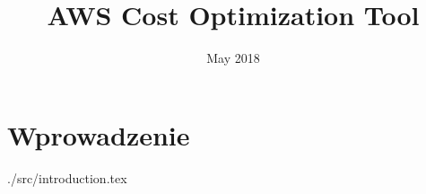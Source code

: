\documentclass[licencjacka,en]{thesisclass}
\title{AWS Cost Optimization Tool}
\date{May 2018}
\begin{document}
\maketitle

\begin{abstract}
  
\end{abstract}

\tableofcontents

\chapter*{Wprowadzenie}
{./src/introduction.tex}
  
\begin{thebibliography}{99}


\end{thebibliography}
\end{document}
